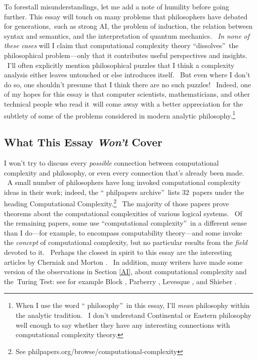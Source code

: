 \documentclass[12pt,onecolumn]{article}%
\begin{document}
To forestall misunderstandings, let me add a note of humility before going
further. This essay will touch on many problems that philosophers have debated
for generations,\ such as strong AI, the problem of induction, the relation
between syntax and semantics, and the interpretation of quantum mechanics.
\ \textit{In none of these cases} will I claim that computational complexity
theory \textquotedblleft dissolves\textquotedblright\ the philosophical
problem---only that it contributes useful perspectives and insights. \ I'll
often explicitly mention philosophical puzzles that I think a complexity
analysis either leaves untouched or else introduces itself. \ But even where I
don't do so, one shouldn't presume that I think there are no such puzzles!
\ Indeed, one of my hopes for this essay is that computer scientists,
mathematicians, and other technical people who read it\ will come away with a
better appreciation for the subtlety of some of the problems considered in
modern analytic philosophy.\footnote{When I use the word \textquotedblleft
philosophy\textquotedblright\ in this essay, I'll \textit{mean} philosophy
within the analytic tradition. \ I don't understand Continental or Eastern
philosophy well enough to say whether they have any interesting connections
with computational complexity theory.}

\subsection{What This Essay \textit{Won't} Cover\label{WONT}}

I won't try to discuss every \textit{possible} connection between
computational complexity and philosophy, or even every connection that's
already been made. \ A small number of philosophers have long invoked
computational complexity ideas in their work; indeed, the \textquotedblleft
philpapers archive\textquotedblright\ lists $32$\ papers under the heading
Computational Complexity.\footnote{See
philpapers.org/browse/computational-complexity} \ The majority of those papers
prove theorems about the computational complexities of various logical
systems. \ Of the remaining papers, some use \textquotedblleft computational
complexity\textquotedblright\ in a different sense than I do---for example, to
encompass computability theory---and some invoke the \textit{concept} of
computational complexity, but no particular results from the \textit{field}
devoted to it. \ Perhaps the closest in spirit to this essay are the
interesting articles by Cherniak \cite{cherniak} and Morton \cite{morton}.
\ In addition, many writers have made some version of the observations in
Section \ref{AI}, about computational complexity and the\ Turing Test: see for
example Block \cite{block}, Parberry \cite{parberry}, Levesque \cite{levesque}%
, and Shieber \cite{shieber}.
\end{document}
